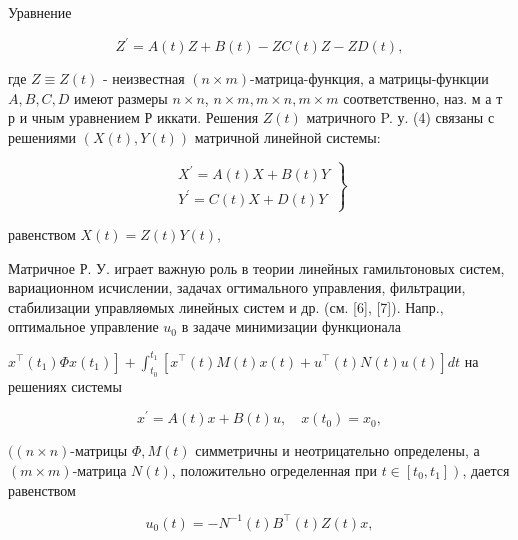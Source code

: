 \documentclass[10pt]{article}
\begin{document}
Уравнение



\[

Z^{\prime}=A(t) Z+B(t)-Z C(t) Z-Z D(t),

\]



где $Z \equiv Z(t)$ - неизвестная $(n \times m)$-матрица-функция, а матрицы-функции $A, B, C, D$ имеют размеры $n \times n$, $n \times m, m \times n, m \times m$ соответственно, наз. м а т р и чным уравнением Р иккати. Решения $Z(t)$ матричного P. у. (4) связаны с решениями $(X(t), Y(t))$ матричной линейной системы:



\[

\left.\begin{array}{l}

X^{\prime}=A(t) X+B(t) Y \\

Y^{\prime}=C(t) X+D(t) Y

\end{array}\right\}

\]



равенством $X(t)=Z(t) Y(t)$,



Матричное Р. У. играет важную роль в теории линейных гамильтоновых систем, вариационном исчислении, задачах огтимального управления, фильтрации, стабилизации управляөмых линейных систем и др. (см. [6], [7]). Напр., оптимальное управление $u_{0}$ в задаче минимизации функционала



$\left.x^{\top}\left(t_{1}\right) \Phi x\left(t_{1}\right)\right]+\int_{t_{0}}^{t_{1}}\left[x^{\top}(t) M(t) x(t)+u^{\top}(t) N(t) u(t)\right] d t$ на решениях системы



\[

x^{\prime}=A(t) x+B(t) u, \quad x\left(t_{0}\right)=x_{0},

\]



$((n \times n)$-матрицы $\Phi, M(t)$ симметричны и неотрицательно определены, а $(m \times m)$-матрица $N(t)$, положительно огределенная при $\left.t \in\left[t_{0}, t_{1}\right]\right)$, дается равенством



\[

u_{0}(t)=-N^{-1}(t) B^{\top}(t) Z(t) x,

\]
\end{document}
